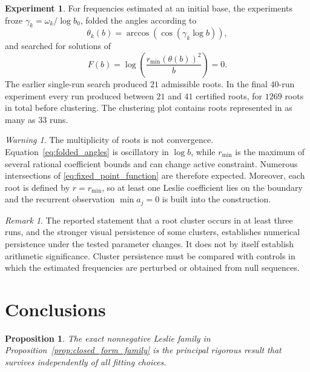 \documentclass[11pt]{amsart}
\numberwithin{equation}{section}
\theoremstyle{plain}
\newtheorem{proposition}[theorem]{Proposition}
\theoremstyle{definition}
\newtheorem{experiment}[theorem]{Experiment}
\theoremstyle{remark}
\newtheorem{remark}[theorem]{Remark}
\newtheorem{warning}[theorem]{Warning}
\begin{document}
\begin{experiment}
\label{exp:fixed_point_roots}
For frequencies estimated at an initial base, the experiments froze $\gamma_k=\omega_k/\log b_0$, folded the angles according to
\begin{equation}
\theta_k(b)=\arccos\!\left(\cos(\gamma_k\log b)\right),
\label{eq:folded_angles}
\end{equation}
and searched for solutions of
\begin{equation}
F(b)=\log\!\left(\frac{r_{\min}(\theta(b))^2}{b}\right)=0.
\label{eq:fixed_point_function}
\end{equation}
The earlier single-run search produced $21$ admissible roots.  In the final $40$-run experiment every run produced between $21$ and $41$ certified roots, for $1269$ roots in total before clustering.  The clustering plot contains roots represented in as many as $33$ runs.
\end{experiment}

\begin{warning}
\label{warn:fixed_point_interpretation}
The multiplicity of roots is not convergence.  Equation~\eqref{eq:folded_angles} is oscillatory in $\log b$, while $r_{\min}$ is the maximum of several rational coefficient bounds and can change active constraint.  Numerous intersections of \eqref{eq:fixed_point_function} are therefore expected.  Moreover, each root is defined by $r=r_{\min}$, so at least one Leslie coefficient lies on the boundary and the recurrent observation $\min a_j=0$ is built into the construction.
\end{warning}

\begin{remark}
\label{rem:persistence_is_not_arithmetic}
The reported statement that a root cluster occurs in at least three runs, and the stronger visual persistence of some clusters, establishes numerical persistence under the tested parameter changes.  It does not by itself establish arithmetic significance.  Cluster persistence must be compared with controls in which the estimated frequencies are perturbed or obtained from null sequences.
\end{remark}

\section{Conclusions}
\label{sec:conclusions}

\begin{proposition}
\label{prop:rigorous_survivor}
The exact nonnegative Leslie family in Proposition~\ref{prop:closed_form_family} is the principal rigorous result that survives independently of all fitting choices.
\end{proposition}
\end{document}
